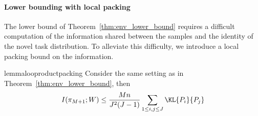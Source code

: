 
\paragraph{Lower bounding with local packing} The lower bound of Theorem~\ref{thm:env_lower_bound} requires a difficult computation of the information shared between the samples and the identity of the novel task distribution. To alleviate this difficulty, we introduce a local packing bound on the information.

\begin{restatable}{lemma}{looproductpacking}\label{lemma:env_local_product_packing}
Consider the same setting as in Theorem~\ref{thm:env_lower_bound}, then
\[I(\pi_{M+1}; W) \leq \frac{Mn}{J^2(J-1)} \sum_{1 \leq i,j \leq J} \KL{P_{i}}{P_{j}}\]
\end{restatable}

